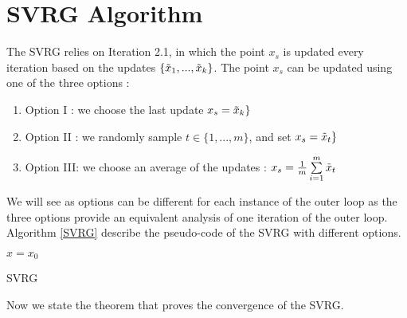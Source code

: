\documentclass[12pt]{report}
\newcounter{theo}[section]
\begin{document}
\section{SVRG Algorithm}
The SVRG relies on Iteration 2.1, in which the point $x_s$ is updated every iteration based on the updates $\{\Tilde{x}_1,...,\Tilde{x}_k\}$. The point $x_s$ can be updated using one of the three options : 
\begin{enumerate}
    \item Option I : we choose the last update $x_s=\Tilde{x}_k\}$
    \item Option II : we randomly sample $t\in\{1,...,m\}$, and set $x_s=\Tilde{x}_t\}$
    \item Option III: we choose an average of the updates : $x_s=\frac{1}{m}\sum\limits_{i=1}^m \Tilde{x}_t$ 
\end{enumerate}

We will see as options can be different for each instance of the outer loop as the three options provide an equivalent analysis of one iteration of the outer loop. Algorithm \ref{SVRG} describe the pseudo-code of the SVRG with different options.
\begin{algorithm}\label{SVRG}
    $x=x_0$\;
    \caption{SVRG}
\end{algorithm}

Now we state the theorem that proves the convergence of the SVRG.
\end{document}

